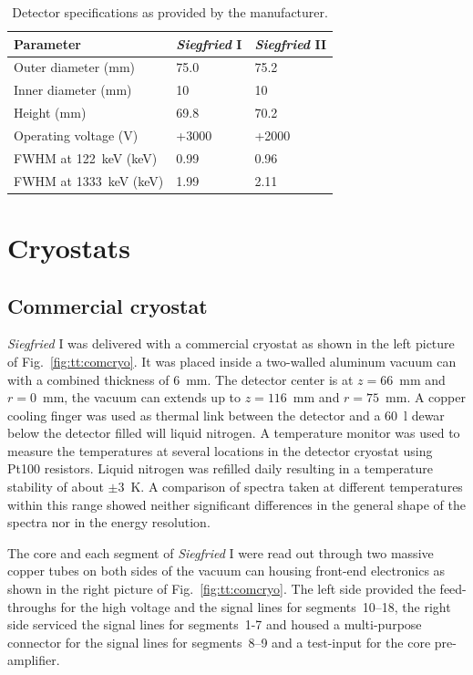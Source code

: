 \begin{table}[tbhp]
\centering
\caption{Detector specifications as provided by the manufacturer.}
\label{tab:tt:detpar}
\begin{tabular}{lll}\\\hline
Parameter & \emph{Siegfried} I  & \emph{Siegfried} II \\\hline
Outer diameter (mm)   & 75.0 & 75.2\\ 
Inner diameter (mm)   & 10 & 10 \\ 
Height (mm)           & 69.8 & 70.2 \\\hline 
Operating voltage (V) & +3000 & +2000 \\ 
FWHM at 122~keV (keV)  & 0.99 & 0.96 \\ 
FWHM at 1333~keV (keV) & 1.99 & 2.11 \\ \hline 
\end{tabular}
\end{table}


\section{Cryostats}
\label{sec:tt:cryo}

\subsection{Commercial cryostat}
\label{sec:tt:comc}
\emph{Siegfried} I was delivered with a commercial cryostat as shown in the left picture of Fig.~\ref{fig:tt:comcryo}. It was placed inside a two-walled aluminum vacuum can with a combined thickness of 6~mm. The detector center is at $z=66$~mm and $r=0$~mm, the vacuum can extends up to $z=116$~mm and $r=75$~mm. A copper cooling finger was used as thermal link between the detector and a 60~l dewar below the detector filled will liquid nitrogen. A temperature monitor was used to measure the temperatures at several locations in the detector cryostat using Pt100 resistors. Liquid nitrogen was refilled daily resulting in a temperature stability of about $\pm3$~K. A comparison of spectra taken at different temperatures within this range showed neither significant differences in the general shape of the spectra nor in the energy resolution.

The core and each segment of \emph{Siegfried} I were read out through two massive copper tubes on both sides of the vacuum can housing front-end electronics as shown in the right picture of Fig.~\ref{fig:tt:comcryo}. The left side provided the feed-throughs for the high voltage and the signal lines for segments~10--18, the right side serviced the signal lines for segments~1-7 and housed a multi-purpose connector for the signal lines for segments~8--9 and a test-input for the core pre-amplifier.

